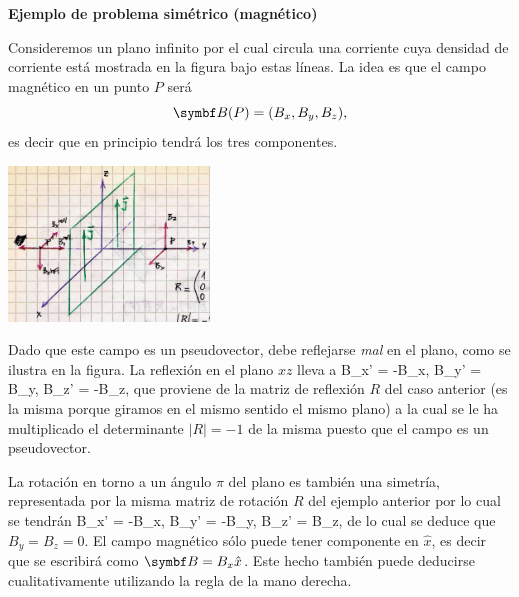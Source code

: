 \documentclass[10pt,oneside]{CBFT_book}
\begin{document}

\begin{ejemplo}{\bf Ejemplo de problema simétrico (magnético)}

Consideremos un plano infinito por el cual circula una corriente cuya densidad de corriente 
está mostrada en la figura bajo estas líneas. 
La idea es que el campo magnético  en un punto $P$ será 
\[
	\vb{B}(P) = (B_x, B_y, B_z), 
\]
es decir que en principio tendrá los tres componentes.
 
\includegraphics[width=0.4\textwidth]{images/fig_ft1_ej_plano_corriente.jpg}

Dado que este campo es un pseudovector, debe reflejarse {\it mal} en el plano, como se ilustra en
la figura. La reflexión en el plano $xz$ lleva a 
\be
	B_x' = -B_x, \qquad B_y' = B_y, \qquad B_z' = -B_z,
	\label{Bsimetria_refl}
\ee
que proviene de la matriz de reflexión $R$ del caso anterior (es la misma porque giramos en el
mismo sentido el mismo plano) a la cual se le ha multiplicado el determinante $|R|=-1$ de la misma
puesto que el campo  es un pseudovector.

La rotación en torno a un ángulo $\pi$ del plano es también una simetría, representada por la misma
matriz de rotación $R$ del ejemplo anterior por lo cual se tendrán 
\be
	B_x' = -B_x, \qquad B_y' = -B_y, \qquad B_z' = B_z,
	\label{Bsimetria_rot}
\ee 
de lo cual se deduce que $ B_y = B_z = 0 $. El campo magnético sólo puede tener componente en $\hat{x}$,
es decir que se escribirá como $\vb{B} = B_x \hat{x}$.
Este hecho también puede deducirse cualitativamente utilizando la regla de la mano derecha.
\end{ejemplo}
\end{document}
